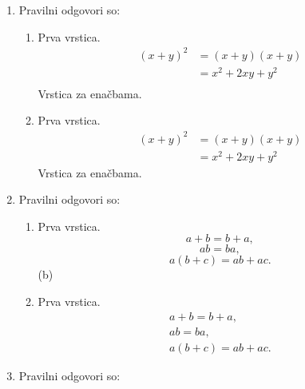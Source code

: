 \documentclass[11pt]{article}
\begin{document}
\begin{enumerate}
    \item Pravilni odgovori so: %
    \begin{enumerate}
        \item Prva vrstica.
\begin{align*}
  (x + y)^2 &= (x + y)(x + y) \\
  &= x^2 + 2 x y + y^2 \\
\end{align*}
        Vrstica za enačbama.
        \item Prva vrstica.
\begin{align*}
  (x + y)^2 &= (x + y)(x + y) \\
  &= x^2 + 2 x y + y^2
\end{align*}
        Vrstica za enačbama.
    \end{enumerate}

    \item Pravilni odgovori so: %
    \begin{enumerate}
        \item Prva vrstica.
\[ a + b = b + a, \]
\[ a b = b a, \]
\[ a (b + c) = a b + a c. \]
         (b)
        \item Prva vrstica.
\begin{gather*}
  a + b = b + a, \\
  a b = b a, \\
  a (b + c) = a b + a c.
\end{gather*}
    \end{enumerate}

    \item Pravilni odgovori so: %

\end{enumerate}
\end{document}
